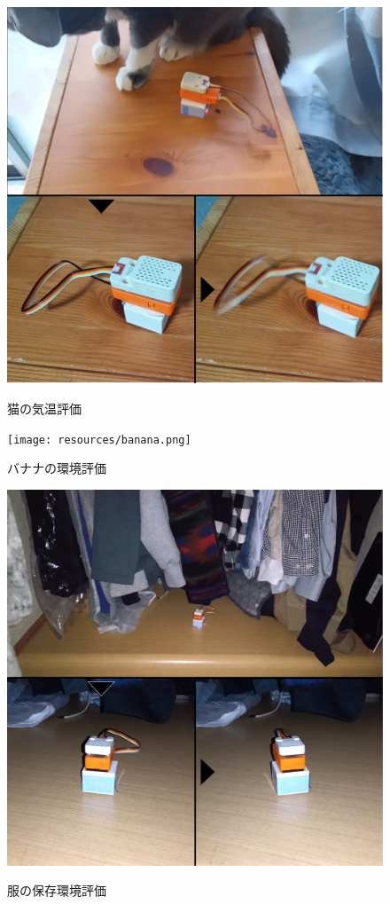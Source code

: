 \documentclass[paper=a4paper,jafontsize=9pt,head_space=15mm,gutter=20mm,
twocolumn,number_of_lines=49, line_length=26zw]{myuarticle}
\begin{document}
\begin{figure}[b]
\begin{center}
\begin{minipage}[b]{0.23\textwidth}
      \includegraphics[keepaspectratio, scale=0.1]{resources/cat.png}
      \caption{猫の気温評価}
    \end{minipage}
    \begin{minipage}[b]{0.23\textwidth}
      \centering
      \texttt{[image: resources/banana.png]}
      \caption{バナナの環境評価}
    \end{minipage}
    \begin{minipage}[b]{0.23\textwidth}
      \centering
      \includegraphics[keepaspectratio, scale=0.1]{resources/clothes.png}
      \caption{服の保存環境評価}
    \end{minipage}
    \label{fig:system-test}
  \end{center}
\end{figure}
\end{document}
